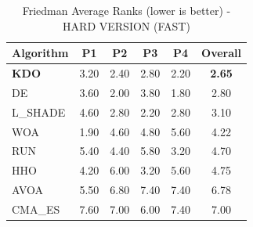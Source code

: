 \begin{table}[htbp]
\centering
\caption{Friedman Average Ranks (lower is better) - HARD VERSION (FAST)}
\label{tab:friedman_ranks}
\small
\begin{tabular}{lccccc}
\toprule
\textbf{Algorithm} & \textbf{P1} & \textbf{P2} & \textbf{P3} & \textbf{P4} & \textbf{Overall} \\
\midrule
\textbf{KDO} & 3.20 & 2.40 & 2.80 & 2.20 & \textbf{2.65} \\
DE & 3.60 & 2.00 & 3.80 & 1.80 & 2.80 \\
L_SHADE & 4.60 & 2.80 & 2.20 & 2.80 & 3.10 \\
WOA & 1.90 & 4.60 & 4.80 & 5.60 & 4.22 \\
RUN & 5.40 & 4.40 & 5.80 & 3.20 & 4.70 \\
HHO & 4.20 & 6.00 & 3.20 & 5.60 & 4.75 \\
AVOA & 5.50 & 6.80 & 7.40 & 7.40 & 6.78 \\
CMA_ES & 7.60 & 7.00 & 6.00 & 7.40 & 7.00 \\
\bottomrule
\end{tabular}
\end{table}
